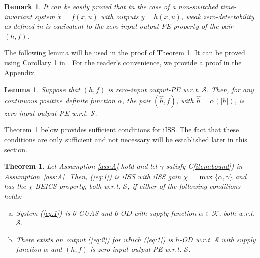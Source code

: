 \documentclass[9pt,final,journal]{IEEEtran}
\newtheorem{teo}{Theorem}
\newtheorem{lema}{Lemma}
\newtheorem{remark}{Remark}
\def\K{\mathcal{K}}
\def\S{\mathcal{S}}
\begin{document}
\begin{remark} 
  \label{rem:w0sdimplies0iope}
  It can be easily proved that in the case of a non-switched time-invariant system $\dot x=f(x,u)$ with outputs $y=h(x,u)$, weak zero-detectability as defined in \cite{angson_tac00} is equivalent to the zero-input output-PE property of the pair $(h,f)$.
 \end{remark}
%
The following lemma will be used in the proof of Theorem \ref{thm:suffcondsiISS}. It can be proved using Corollary 1 in \cite{leetan_tac15}. For the reader's convenience, we provide a proof in the Appendix.
\begin{lema} \label{lem:ope}
Suppose that $(h,f)$ is zero-input output-PE w.r.t. $\S$. Then, for any continuous positive definite function $\alpha$, the pair $(\hat{h},f)$, with $\hat{h}=\alpha(|h|)$, is zero-input output-PE w.r.t. $\S$.
\end{lema}
%
Theorem~\ref{thm:suffcondsiISS} below provides sufficient conditions for iISS. The fact that these conditions are only sufficient and not necessary will be established later in this section. 
%
\begin{teo}
  \label{thm:suffcondsiISS}
  Let Assumption \ref{ass:A} hold and let $\gamma$ satisfy C\ref{item:bound}) in Assumption~\ref{ass:A}. Then, (\ref{eq:1}) is iISS with iISS gain $\chi=\max\{\alpha,\gamma\}$ and has the $\chi$-BEICS property, both w.r.t. $\S$, if either of the following conditions holds:
  \begin{enumerate}[a)]
  \item System (\ref{eq:1}) is 0-GUAS and 0-OD with supply function
    $\alpha \in \K$, both w.r.t. $\S$.\label{item:00ODimplyiISS}
  \item There exists an output (\ref{eq:2}) for which (\ref{eq:1}) is $h$-OD w.r.t. $\S$ with supply function $\alpha$ and $(h,f)$ is zero-input output-PE w.r.t. $\S$. \label{item:hOD-0OPEimpliesiISS}
  \end{enumerate}
\end{teo}
\end{document}
